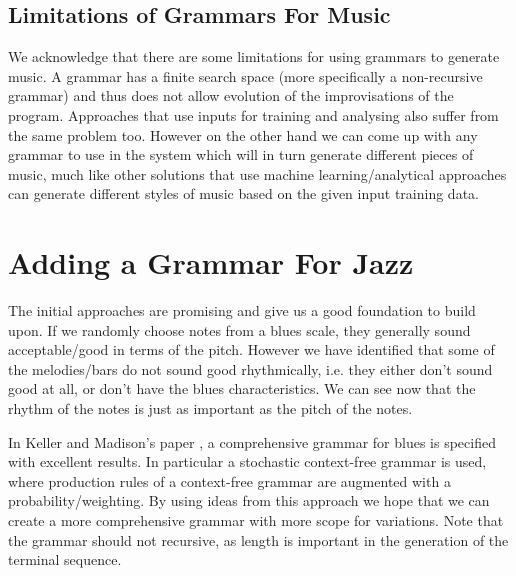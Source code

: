 \documentclass[pdftex,12pt,a4paper]{report}
\begin{document}
\subsection{Limitations of Grammars For Music} \label{grammarissues}
We acknowledge that there are some limitations for using grammars to generate music. A grammar has a finite search space (more specifically a non-recursive grammar) and thus does not allow evolution of the improvisations of the program. Approaches that use inputs for training and analysing also suffer from the same problem too. However on the other hand we can come up with any grammar to use in the system which will in turn generate different pieces of music, much like other solutions that use machine learning/analytical approaches can generate different styles of music based on the given input training data.

\section{Adding a Grammar For Jazz}
The initial approaches are promising and give us a good foundation to build upon. If we randomly choose notes from a blues scale, they generally sound acceptable/good in terms of the pitch. However we have identified that some of the melodies/bars do not sound good rhythmically, i.e. they either don't sound good at all, or don't have the blues characteristics. We can see now that the rhythm of the notes is just as important as the pitch of the notes. 

In Keller and Madison's paper \cite{keller07}, a comprehensive grammar for blues is specified with excellent results. In particular a stochastic context-free grammar is used, where production rules of a context-free grammar are augmented with a probability/weighting. By using ideas from this approach we hope that we can create a more comprehensive grammar with more scope for variations. Note that the grammar should not recursive, as length is important in the generation of the terminal sequence. 
\end{document}

